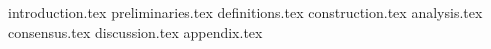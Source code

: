 {introduction.tex}
{preliminaries.tex}
{definitions.tex}
{construction.tex}
{analysis.tex}
{consensus.tex}
{discussion.tex}
{appendix.tex}